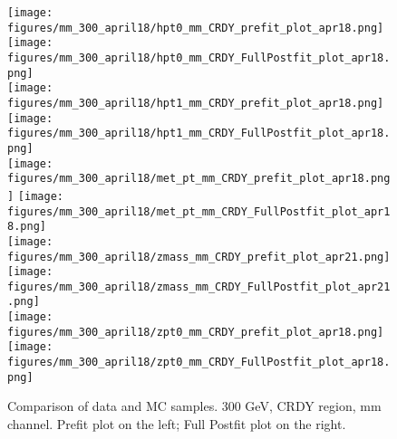 \begin{figure}[H]
\begin{center}
\texttt{[image: figures/mm\_300\_april18/hpt0\_mm\_CRDY\_prefit\_plot\_apr18.png]}
\texttt{[image: figures/mm\_300\_april18/hpt0\_mm\_CRDY\_FullPostfit\_plot\_apr18.png]}\\
\texttt{[image: figures/mm\_300\_april18/hpt1\_mm\_CRDY\_prefit\_plot\_apr18.png]}
\texttt{[image: figures/mm\_300\_april18/hpt1\_mm\_CRDY\_FullPostfit\_plot\_apr18.png]}\\
\texttt{[image: figures/mm\_300\_april18/met\_pt\_mm\_CRDY\_prefit\_plot\_apr18.png]}
\texttt{[image: figures/mm\_300\_april18/met\_pt\_mm\_CRDY\_FullPostfit\_plot\_apr18.png]}\\
\texttt{[image: figures/mm\_300\_april18/zmass\_mm\_CRDY\_prefit\_plot\_apr21.png]}
\texttt{[image: figures/mm\_300\_april18/zmass\_mm\_CRDY\_FullPostfit\_plot\_apr21.png]}\\
\texttt{[image: figures/mm\_300\_april18/zpt0\_mm\_CRDY\_prefit\_plot\_apr18.png]}
\texttt{[image: figures/mm\_300\_april18/zpt0\_mm\_CRDY\_FullPostfit\_plot\_apr18.png]}\\
\caption[Data-MC comparison in CRDY, other variables.]{Comparison of data and MC samples. 300 GeV, CRDY region, mm channel. Prefit plot on the left; Full Postfit plot on the right.}
\label{MCcomparisons_mm_low_CRDY_2}
\end{center}
\end{figure}

